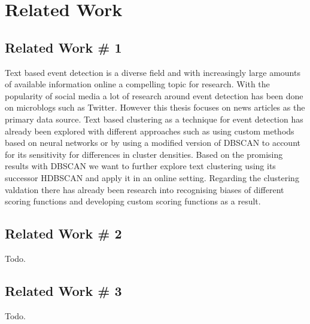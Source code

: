 \section{Related Work}

\subsection{Related Work \# 1}
Text based event detection is a diverse field and with increasingly large amounts of available information online a compelling topic for research.
With the popularity of social media a lot of research around event detection has been done on microblogs\cite{microblog_clustering} such as Twitter\cite{twitter_survey}\cite{social_media_survey}.
However this thesis focuses on news articles as the primary data source.
Text based clustering as a technique for event detection has already been explored with different approaches such as using custom methods based on neural networks\cite{text_clustering_topic_detection}
or by using a modified version of DBSCAN to account for its sensitivity for differences in cluster densities\cite{dbscan_martingale}.
Based on the promising results with DBSCAN we want to further explore text clustering using its successor HDBSCAN\cite{McInnes2017} and apply it in an online setting.
Regarding the clustering valdation there has already been research into recognising biases of different scoring functions \cite{Wu:2009:ARM:1557019.1557115}
and developing custom scoring functions as a result\cite{gates2017comparing}.

\subsection{Related Work \# 2}
Todo.

\subsection{Related Work \# 3}
Todo.
